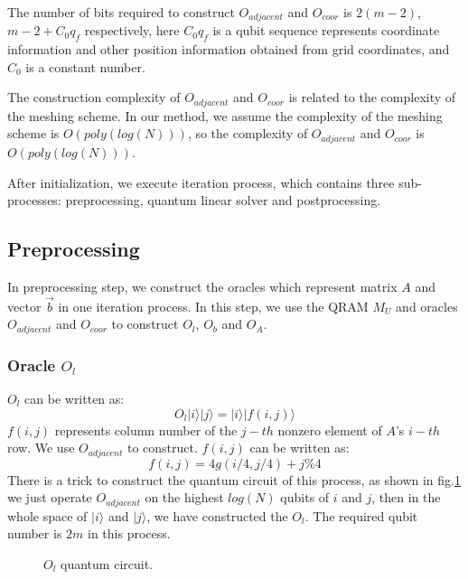 \documentclass[%
 reprint,
 amsmath,amssymb,
pra,
]{revtex4-1}
\begin{document}
The number of bits required to construct $O_{adjacent}$ and $O_{coor}$ is $2(m-2)$, $m-2+C_0q_f$ respectively, here $C_0q_f$ is a qubit sequence represents coordinate information and other position information obtained from grid coordinates, and $C_0$ is a constant number.

The construction complexity of $O_{adjacent}$ and $O_{coor}$ is related to the complexity of the meshing scheme. In our method, we assume the complexity of the meshing scheme is $O(poly(log(N)))$, so the complexity of $O_{adjacent}$ and $O_{coor}$ is $O(poly(log(N)))$. 

After initialization, we execute iteration process, which contains three sub-processes: preprocessing, quantum linear solver and postprocessing.

\subsection{Preprocessing}

In preprocessing step, we construct the oracles which represent matrix $A$ and vector $\vec{b}$ in one iteration process. In this step, we use the QRAM $M_U$ and oracles $O_{adjacent}$ and $O_{coor}$ to construct $O_l$, $O_b$ and $O_A$. 

\subsubsection{Oracle $O_l$}
$O_l$ can be written as:
$$
O_l|i\rangle|j\rangle=|i\rangle|f(i,j)\rangle
$$
$f(i,j)$ represents column number of the $j-th$ nonzero element of $A$'s $i-th$ row. We use $O_{adjacent}$ to construct. $f(i,j)$ can be written as:
$$
f(i,j)=4g(i/4,j/4)+j\%4
$$
There is a trick to construct the quantum circuit of this process, as shown in fig.\ref{OL} we just operate $O_{adjacent}$ on the highest $log(N)$ qubits of $i$ and $j$, then in the whole space of $|i\rangle$ and $|j\rangle$, we have constructed the $O_l$. The required qubit number is $2m$ in this process. 

\begin{figure}[htbp]
    \caption{$O_l$ quantum circuit. }
    \label{OL}
\end{figure}
\end{document}
